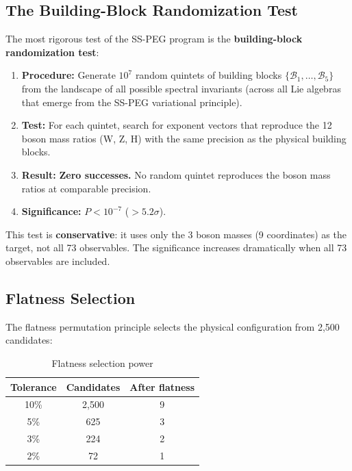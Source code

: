 \subsection{The Building-Block Randomization Test}\label{sec:randomization_test}

The most rigorous test of the SS-PEG program is the \textbf{building-block randomization test}:

\begin{enumerate}
\item \textbf{Procedure:} Generate $10^7$ random quintets of building blocks $\{\mathcal{B}_1, \ldots, \mathcal{B}_5\}$ from the landscape of all possible spectral invariants (across all Lie algebras that emerge from the SS-PEG variational principle).
\item \textbf{Test:} For each quintet, search for exponent vectors that reproduce the 12 boson mass ratios (W, Z, H) with the same precision as the physical building blocks.
\item \textbf{Result:} \textbf{Zero successes.} No random quintet reproduces the boson mass ratios at comparable precision.
\item \textbf{Significance:} $P < 10^{-7}$ ($> 5.2\sigma$).
\end{enumerate}

This test is \textbf{conservative}: it uses only the 3 boson masses (9 coordinates) as the target, not all 73 observables. The significance increases dramatically when all 73 observables are included.

\subsection{Flatness Selection}\label{sec:flatness_selection}

The flatness permutation principle selects the physical configuration from 2,500 candidates:

\begin{table}[h]
\centering
\caption{Flatness selection power}
\begin{tabular}{ccc}
\hline\hline
Tolerance & Candidates & After flatness \\
\hline
10\% & 2,500 & 9 \\
5\% & 625 & 3 \\
3\% & 224 & 2 \\
2\% & 72 & 1 \\
\hline\hline
\end{tabular}
\end{table}

